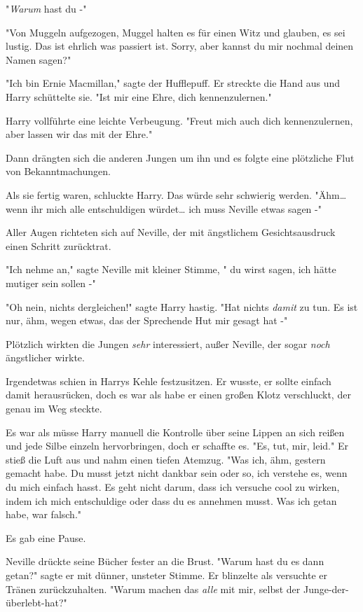 {"\emph{Warum} hast du -"

"Von Muggeln aufgezogen, Muggel halten es für einen Witz und glauben, es sei lustig. Das ist ehrlich was passiert ist. Sorry, aber kannst du mir nochmal deinen Namen sagen?"

"Ich bin Ernie Macmillan," sagte der Hufflepuff. Er streckte die Hand aus und Harry schüttelte sie. "Ist mir eine Ehre, dich kennenzulernen."

Harry vollführte eine leichte Verbeugung. "Freut mich auch dich kennenzulernen, aber lassen wir das mit der Ehre."

Dann drängten sich die anderen Jungen um ihn und es folgte eine plötzliche Flut von Bekanntmachungen.

Als sie fertig waren, schluckte Harry. Das würde sehr schwierig werden. "Ähm… wenn ihr mich alle entschuldigen würdet… ich muss Neville etwas sagen -"

Aller Augen richteten sich auf Neville, der mit ängstlichem Gesichtsausdruck einen Schritt zurücktrat.

"Ich nehme an," sagte Neville mit kleiner Stimme, " du wirst sagen, ich hätte mutiger sein sollen -"

"Oh nein, nichts dergleichen!" sagte Harry hastig. "Hat nichts \emph{damit} zu tun. Es ist nur, ähm, wegen etwas, das der Sprechende Hut mir gesagt hat -"

Plötzlich wirkten die Jungen \emph{sehr} interessiert, außer Neville, der sogar \emph{noch} ängstlicher wirkte.

Irgendetwas schien in Harrys Kehle festzusitzen. Er wusste, er sollte einfach damit herausrücken, doch es war als habe er einen großen Klotz verschluckt, der genau im Weg steckte.

Es war als müsse Harry manuell die Kontrolle über seine Lippen an sich reißen und jede Silbe einzeln hervorbringen, doch er schaffte es. "Es, tut, mir, leid." Er stieß die Luft aus und nahm einen tiefen Atemzug. "Was ich, ähm, gestern gemacht habe. Du musst jetzt nicht dankbar sein oder so, ich verstehe es, wenn du mich einfach hasst. Es geht nicht darum, dass ich versuche cool zu wirken, indem ich mich entschuldige oder dass du es annehmen musst. Was ich getan habe, war falsch."

Es gab eine Pause.

Neville drückte seine Bücher fester an die Brust. "Warum hast du es dann getan?" sagte er mit dünner, unsteter Stimme. Er blinzelte als versuchte er Tränen zurückzuhalten. "Warum machen das \emph{alle} mit mir, selbst der Junge-der-überlebt-hat?"

}
